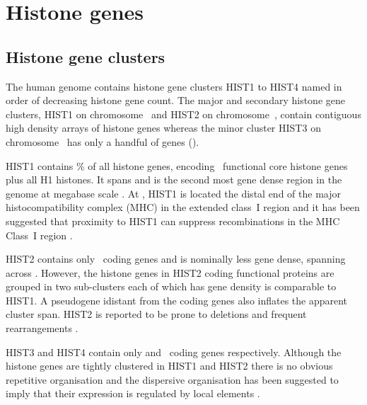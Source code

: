 \section{Histone genes}

  \subsection{Histone gene clusters}
    The human genome contains histone gene clusters HIST1 to HIST4 named in order of decreasing histone gene count.
	The major and secondary histone gene clusters, 
	HIST1 on chromosome~\HISTOneLocus{} and HIST2 on chromosome~\HISTTwoLocus{},
	contain contiguous high density arrays of histone genes 
	whereas the minor cluster HIST3 on chromosome~\HISTThreeLocus{} has only a handful of genes ().

    HIST1 contains \% of all histone genes, 
	encoding \CodingGenesInHISTOne{}~functional core histone genes plus all H1 histones. 
	It spans \HISTOneSpan{} 
	and is the second most gene dense region in the genome at megabase scale \citep{MHC-III-analysis}. 
	At \HISTOneLocus{}, HIST1 is located the distal end of the major histocompatibility complex (MHC) 
	in the extended class~I region \citep{MHC-I-transcript, MHC-complete-sequencing-1999} 
	and it has been suggested that proximity to HIST1 can suppress recombinations in the MHC Class~I region \citep{MHC-repressed-by-HIST}.

    HIST2 contains only \CodingGenesInHISTTwo{}~coding genes 
	and is nominally less gene dense, spanning \HISTTwoSpan{} across \HISTTwoLocus{}.
	However, the histone genes in HIST2 coding functional proteins
	are grouped in two sub-clusters each of which has gene density is comparable to HIST1.
	A pseudogene idistant from the coding genes also inflates the apparent cluster span.
    HIST2 is reported to be prone to deletions and frequent rearrangements \citep{HISTTwo-prone-deletion-discovery, HISTTwo-prone-deletion-focus}.

	HIST3 and HIST4 contain only \CodingGenesInHISTThree{} and \CodingGenesInHISTFour{}~coding genes respectively. 
	Although the histone genes are tightly clustered in HIST1 and HIST2 there is no obvious repetitive organisation 
	and the dispersive organisation has been suggested to imply that their expression is regulated by local elements \citep{close-regulators}.

